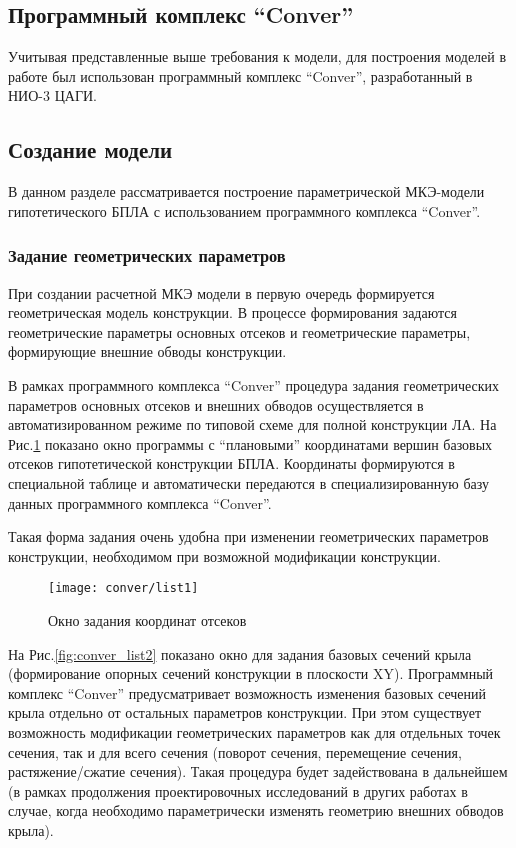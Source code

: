 \subsection{Программный комплекс ``Conver''}
Учитывая представленные выше требования к модели, для построения моделей в работе был использован программный комплекс ``Conver'', разработанный в НИО-3 ЦАГИ. 


\subsection{Создание модели}
\label{sec:creationOfOneModel}

В данном разделе рассматривается построение параметрической МКЭ-модели гипотетического БПЛА с использованием программного комплекса ``Conver''. 

\subsubsection{Задание геометрических параметров}
При создании расчетной МКЭ модели в первую очередь формируется геометрическая модель конструкции. В процессе формирования задаются геометрические параметры основных отсеков и геометрические параметры, формирующие внешние обводы конструкции. 

В рамках программного комплекса ``Conver'' процедура задания геометрических параметров основных отсеков и внешних обводов осуществляется в автоматизированном режиме по типовой схеме для полной конструкции ЛА. На Рис.\ref{fig:conver_list1} показано окно программы с ``плановыми'' координатами вершин базовых отсеков гипотетической конструкции БПЛА. Координаты формируются в специальной таблице и автоматически передаются в специализированную базу данных программного комплекса ``Conver''. 

Такая форма задания очень удобна при изменении геометрических параметров конструкции, необходимом при возможной модификации конструкции. 

\begin{figure}[H]
\centering
\texttt{[image: conver/list1]}
\caption{Окно задания координат отсеков}
\label{fig:conver_list1}
\end{figure}


На Рис.\ref{fig:conver_list2} показано окно для задания базовых сечений крыла (формирование опорных сечений конструкции в плоскости XY). Программный комплекс ``Conver''  предусматривает возможность изменения базовых сечений крыла отдельно от остальных параметров конструкции. При этом существует возможность модификации геометрических параметров  как для отдельных точек сечения, так и для всего сечения (поворот сечения, перемещение сечения, растяжение/сжатие сечения). Такая процедура будет задействована в дальнейшем (в рамках продолжения проектировочных исследований в других работах в случае, когда необходимо параметрически изменять геометрию внешних обводов крыла).

